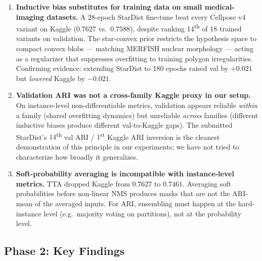 \documentclass[a4paper,11pt]{article}
\begin{document}
\begin{enumerate}
    \item \textbf{Inductive bias substitutes for training data on small medical-imaging datasets.} A 28-epoch StarDist fine-tune beat every Cellpose v4 variant on Kaggle ($0.7627$ vs.\ $0.7588$), despite ranking 14\textsuperscript{th} of 18 trained variants on validation. The star-convex prior restricts the hypothesis space to compact convex blobs --- matching MERFISH nuclear morphology --- acting as a regularizer that suppresses overfitting to training polygon irregularities. Confirming evidence: extending StarDist to 180 epochs raised val by $+0.021$ but \emph{lowered} Kaggle by $-0.021$.

    \item \textbf{Validation ARI was not a cross-family Kaggle proxy in our setup.} On instance-level non-differentiable metrics, validation appears reliable \emph{within} a family (shared overfitting dynamics) but unreliable \emph{across} families (different inductive biases produce different val-to-Kaggle gaps). The submitted StarDist's $14$\textsuperscript{th} val ARI / $1$\textsuperscript{st} Kaggle ARI inversion is the cleanest demonstration of this principle in our experiments; we have not tried to characterize how broadly it generalizes.

    \item \textbf{Soft-probability averaging is incompatible with instance-level metrics.} TTA dropped Kaggle from $0.7627$ to $0.7461$. Averaging soft probabilities before non-linear NMS produces masks that are not the ARI-mean of the averaged inputs. For ARI, ensembling must happen at the hard-instance level (e.g.\ majority voting on partitions), not at the probability level.
\end{enumerate}

\subsection{Phase 2: Key Findings}
\end{document}
